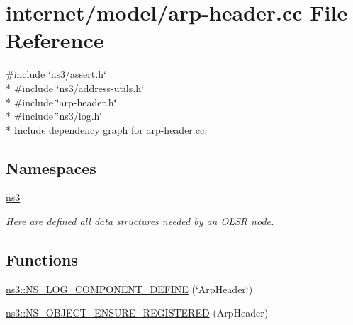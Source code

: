 \hypertarget{arp-header_8cc}{}\section{internet/model/arp-\/header.cc File Reference}
\label{arp-header_8cc}
{\ttfamily \#include \char`\"{}ns3/assert.\+h\char`\"{}}\\*
{\ttfamily \#include \char`\"{}ns3/address-\/utils.\+h\char`\"{}}\\*
{\ttfamily \#include \char`\"{}arp-\/header.\+h\char`\"{}}\\*
{\ttfamily \#include \char`\"{}ns3/log.\+h\char`\"{}}\\*
Include dependency graph for arp-\/header.cc\+:
\subsection*{Namespaces}
\begin{DoxyCompactItemize}
\item 
 \hyperlink{namespacens3}{ns3}
\begin{DoxyCompactList}\small\item\em Here are defined all data structures needed by an O\+L\+SR node. \end{DoxyCompactList}\end{DoxyCompactItemize}
\subsection*{Functions}
\begin{DoxyCompactItemize}
\item 
\hyperlink{namespacens3_a62c630665bd2d0eacb7120588481fcf2}{ns3\+::\+N\+S\+\_\+\+L\+O\+G\+\_\+\+C\+O\+M\+P\+O\+N\+E\+N\+T\+\_\+\+D\+E\+F\+I\+NE} (\char`\"{}Arp\+Header\char`\"{})
\item 
\hyperlink{namespacens3_ade76b6ef23a1542b1c9af4d3c15ef46d}{ns3\+::\+N\+S\+\_\+\+O\+B\+J\+E\+C\+T\+\_\+\+E\+N\+S\+U\+R\+E\+\_\+\+R\+E\+G\+I\+S\+T\+E\+R\+ED} (Arp\+Header)
\end{DoxyCompactItemize}
